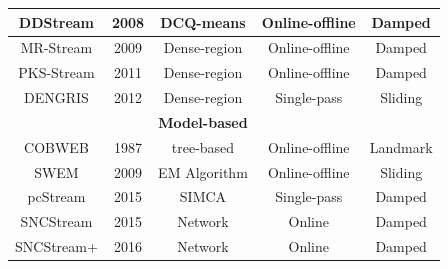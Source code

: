 \begin{table}[h]
\begin{tabular}{c c c c c}
      DDStream           &    2008        &    DCQ-means          &     Online-offline & Damped \\
    \hline 
      MR-Stream          &    2009        &     Dense-region      &  Online-offline    & Damped\\
    \hline 
      PKS-Stream         &    2011        &    Dense-region       &  Online-offline    & Damped\\
    \hline 
      DENGRIS            &    2012        &   Dense-region        &  Single-pass       & Sliding\\
      \hline 
      \hline
     \rowcolor{lightgray}& &\rowcolor{lightgray}\centering\textbf{Model-based}  & &  \\
      \hline 
      \hline
      COBWEB             &    1987        &   tree-based      &    Online-offline   & Landmark \\
     \hline
      SWEM               &    2009        &  EM Algorithm     &  Online-offline     & Sliding\\
     \hline
     pcStream            &    2015        &    SIMCA          &   Single-pass       & Damped  \\
    \hline 
      SNCStream          &    2015        &    Network        &   Online            & Damped  \\
    \hline 
    SNCStream+      &    2016        &       Network     &    Online           & Damped  \\
      
\bottomrule
    \end{tabular}
\end{table}








